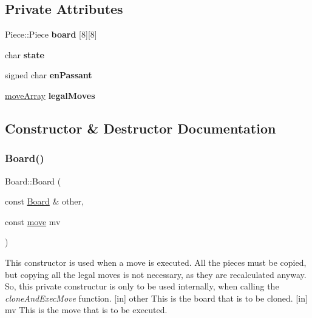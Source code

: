 \subsection*{Private Attributes}
\begin{DoxyCompactItemize}
\item 
\mbox{\label{classBoard_acdbd7620b4c8bc08b2e42623c2a12a39}} 
Piece\+::\+Piece {\bfseries board} \mbox{[}8\mbox{]}\mbox{[}8\mbox{]}
\item 
\mbox{\label{classBoard_a46a6e23b1b18542b10938f2b333862f1}} 
char {\bfseries state}
\item 
\mbox{\label{classBoard_aad3145585c03f739311c35fa8f3277d3}} 
signed char {\bfseries en\+Passant}
\item 
\mbox{\label{classBoard_aaf6a2575c3bc280ddc9e445efd213e14}} 
\hyperlink{structmoveArray}{move\+Array} {\bfseries legal\+Moves}
\end{DoxyCompactItemize}


\subsection{Constructor \& Destructor Documentation}
\mbox{\label{classBoard_a632d2e0f09a1ad6fe835dc11ef1238cc}} 
\subsubsection{\texorpdfstring{Board()}{Board()}\hspace{0.1cm}{\footnotesize\ttfamily [1/2]}}
{\footnotesize\ttfamily Board\+::\+Board (\begin{DoxyParamCaption}\item[{const \hyperlink{classBoard}{Board} \&}]{other,  }\item[{const \hyperlink{structmove}{move}}]{mv }\end{DoxyParamCaption})\hspace{0.3cm}{\ttfamily [private]}}

This constructor is used when a move is executed. All the pieces must be copied, but copying all the legal moves is not necessary, as they are recalculated anyway. So, this private constructur is only to be used internally, when calling the {\itshape clone\+And\+Exec\+Move} function. \mbox{[}in\mbox{]} other This is the board that is to be cloned. \mbox{[}in\mbox{]} mv This is the move that is to be executed. \mbox{\label{classBoard_a8dd2a85d6b43bcab4eaf83e1541aeb18}} 
